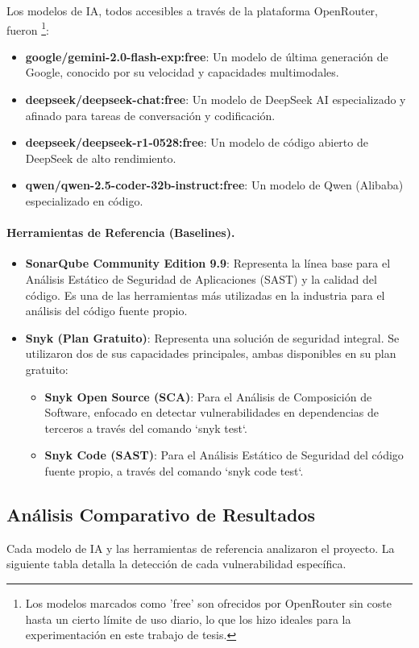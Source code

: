 Los modelos de IA, todos accesibles a través de la plataforma OpenRouter, fueron \footnote{Los modelos marcados como 'free' son ofrecidos por OpenRouter sin coste hasta un cierto límite de uso diario, lo que los hizo ideales para la experimentación en este trabajo de tesis.}:
\begin{itemize}
    \item \textbf{google/gemini-2.0-flash-exp:free}: Un modelo de última generación de Google, conocido por su velocidad y capacidades multimodales.
    \item \textbf{deepseek/deepseek-chat:free}: Un modelo de DeepSeek AI especializado y afinado para tareas de conversación y codificación.
    \item \textbf{deepseek/deepseek-r1-0528:free}: Un modelo de código abierto de DeepSeek de alto rendimiento.
    \item \textbf{qwen/qwen-2.5-coder-32b-instruct:free}: Un modelo de Qwen (Alibaba) especializado en código.
\end{itemize}

\paragraph{Herramientas de Referencia (Baselines).}
\begin{itemize}
\item \textbf{SonarQube Community Edition 9.9}: Representa la línea base para el Análisis Estático de Seguridad de
Aplicaciones (SAST) y la calidad del código. Es una de las herramientas más utilizadas en la industria para el análisis del código fuente propio.
\item \textbf{Snyk (Plan Gratuito)}: Representa una solución de seguridad integral. Se utilizaron dos de sus capacidades principales, ambas disponibles en su plan gratuito: \begin{itemize}    \item \textbf{Snyk Open Source (SCA)}: Para el Análisis de Composición de Software, enfocado en detectar vulnerabilidades en dependencias de terceros a través del comando `snyk test`.    \item \textbf{Snyk Code (SAST)}: Para el Análisis Estático de Seguridad del código fuente propio, a través del comando `snyk code test`.\end{itemize}
\end{itemize}

\subsection{Análisis Comparativo de Resultados}
\label{subsec:analisis_comparativo_resultados}
Cada modelo de IA y las herramientas de referencia analizaron el proyecto. La siguiente tabla detalla la detección de cada vulnerabilidad específica.

